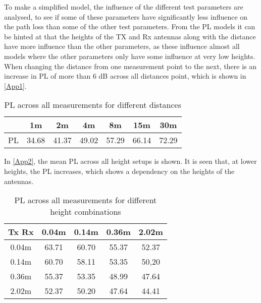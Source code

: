 
To make a simplified model, the influence of the different test parameters are analysed, to see if some of these parameters have significantly less influence on the path loss than some of the other test parameters. From the PL models it can be hinted at that the heights of the TX and Rx antennas along with the distance have more influence than the other parameters, as these influence almost all models where the other parameters only have some influence at very low heights.\\   


When changing the distance from one measurement point to the next, there is an increase in PL of more than 6 dB across all distances point, which is shown in \autoref{App1}.

\begin{table}[!htbp]
\centering
\begin{tabular}{|c|c|c|c|c|c|c|}
\hline
   & 1m & 2m & 4m & 8m & 15m & 30m\\
\hline
PL & 34.68 & 41.37 & 49.02 & 57.29 & 66.14 & 72.29 \\
\hline
\end{tabular}
\caption{PL across all measurements for different distances}
\label{App1}
\end{table}



In \autoref{App2}, the mean PL across all height setups is shown. It is seen that, at lower heights, the PL increases, which shows a dependency on the heights of the antennas.

\begin{table}[!htbp]
\centering
\begin{tabular}{|c|c|c|c|c|}
\hline
Tx Rx & 0.04m & 0.14m & 0.36m & 2.02m \\
\hline
0.04m & 63.71 & 60.70 & 55.37 & 52.37\\
\hline
0.14m & 60.70 & 58.11 & 53.35 & 50,20\\
\hline
0.36m & 55.37 & 53.35 & 48.99 & 47.64\\
\hline
2.02m & 52.37 & 50.20 & 47.64 & 44.41\\
\hline
\end{tabular}
\caption{PL across all measurements for different height combinations}
\label{App2}
\end{table}


